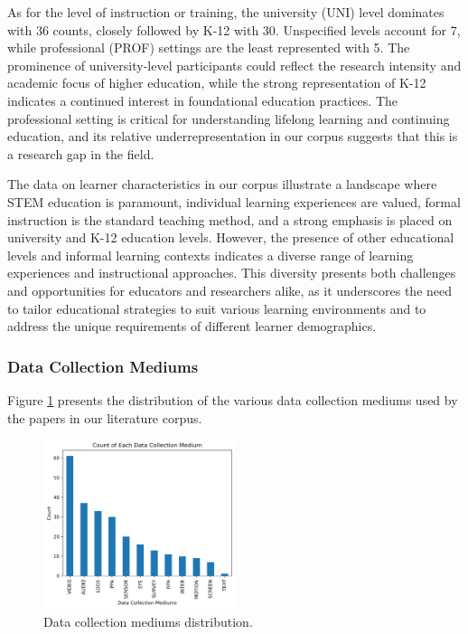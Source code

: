 \documentclass[manuscript,screen,review]{acmart}
\begin{document}
As for the level of instruction or training, the university (UNI) level dominates with 36 counts, closely followed by K-12 with 30. Unspecified levels account for 7, while professional (PROF) settings are the least represented with 5. The prominence of university-level participants could reflect the research intensity and academic focus of higher education, while the strong representation of K-12 indicates a continued interest in foundational education practices. The professional setting is critical for understanding lifelong learning and continuing education, and its relative underrepresentation in our corpus suggests that this is a research gap in the field.

The data on learner characteristics in our corpus illustrate a landscape where STEM education is paramount, individual learning experiences are valued, formal instruction is the standard teaching method, and a strong emphasis is placed on university and K-12 education levels. However, the presence of other educational levels and informal learning contexts indicates a diverse range of learning experiences and instructional approaches. This diversity presents both challenges and opportunities for educators and researchers alike, as it underscores the need to tailor educational strategies to suit various learning environments and to address the unique requirements of different learner demographics.


\subsubsection{Data Collection Mediums}

Figure \ref{fig:data_collection_mediums} presents the distribution of the various data collection mediums used by the papers in our literature corpus.

\begin{figure}
  \begin{center}
        \includegraphics[width=0.5\textwidth]{img/statistical_imgs/data_collection_mediums.png}
  \end{center}
  \caption{Data collection mediums distribution.}
  \label{fig:data_collection_mediums}
\end{figure}
\end{document}
